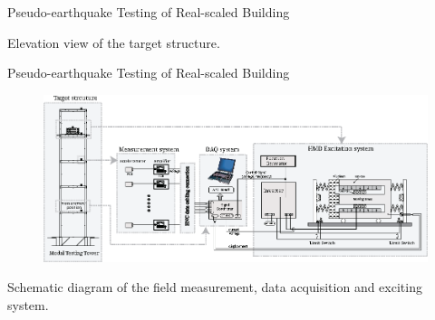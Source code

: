 \documentclass[usepdftitle=false]{beamer}
\begin{document}
\begin{frame}{Pseudo-earthquake Testing of Real-scaled Building}
\begin{figure}[!ht]
\centering
\setcounter{subfigure}{0}
\label{fig:7-1}
\end{figure}
Elevation view of the target structure.
\end{frame}

\begin{frame}{Pseudo-earthquake Testing of Real-scaled Building}
\begin{figure}[ht]
\centering
\includegraphics[width=1\textwidth] {figure/7-3.eps}
\label{fig:7-3}
\end{figure}
Schematic diagram of the field measurement, data acquisition and exciting system.
\end{frame}
\end{document}
